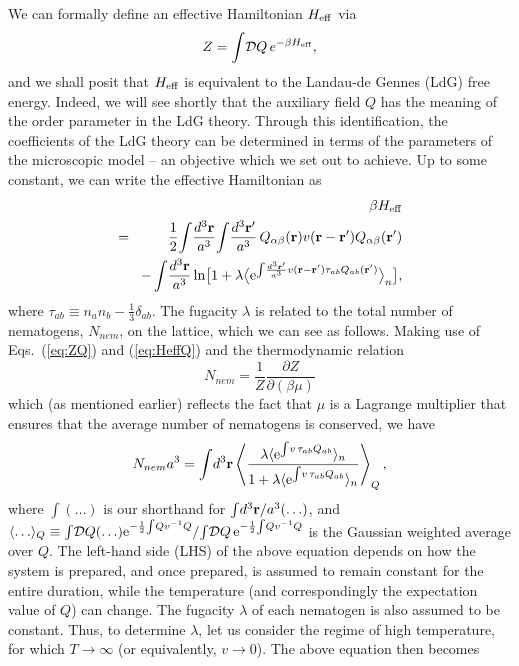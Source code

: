 \documentclass[jcp,aps,twocolumn,showpacs,supergroupedaddress,epsfig,amsmath,amssymb,eqsecnum]{revtex4}
\newcommand{\be}{\begin{equation}}
\newcommand{\ee}{\end{equation}}
\newcommand{\ba}{\begin{eqnarray}}
\newcommand{\ea}{\end{eqnarray}}
\newcommand{\rv}{{\bf r}}
\begin{document}
We can formally define an effective Hamiltonian $H_{{\rm eff}}$ via
\be
\label{eq:ZQ}
Z = \int \! \mathcal{D}Q \, e^{-\beta H_{{\rm eff}}},
\ee
and we shall posit that $H_{{\rm eff}}$ is equivalent to the Landau-de Gennes (LdG) free energy. Indeed, we will see shortly that the auxiliary field $Q$ has the meaning of the order parameter in the LdG theory. Through this identification, the coefficients of the LdG theory can be determined in terms of the parameters of the microscopic model -- an objective which we set out to achieve. 
Up to some constant, we can write the effective Hamiltonian as
\ba
\label{eq:HeffQ}
&&\beta H_{{\rm eff}} 
\\
&\!=\!& 
\frac{1}{2} 
\!\int \! \frac{d^3\rv}{a^3} \! \int \! \frac{d^3\rv'}{a^3} \, 
Q_{\alpha\beta}(\rv) v(\rv-\rv') Q_{\alpha\beta}(\rv') 
\nonumber\\
&&- \int \! \frac{d^3\rv}{a^3} \ln \! 
\big[ 
1 + \lambda \big\langle 
{\rm e}^{\int \! \frac{d^3\rv'}{a^3} v(\rv-\rv') \tau_{ab} Q_{ab}(\rv')}
\big\rangle_{n}
\big],
\nonumber
\ea
where $\tau_{ab} \equiv n_{a}n_{b}-\frac{1}{3}\delta_{ab}$. 
The fugacity $\lambda$ is related to the total number of nematogens, $N_{nem}$, on the lattice, which we can see as follows. Making use of Eqs.~(\ref{eq:ZQ}) and (\ref{eq:HeffQ}) and the thermodynamic relation 
\be
N_{nem} = \frac{1}{Z} \frac{\partial Z}{\partial (\beta \mu)} 
\ee
which (as mentioned earlier) reflects the fact that $\mu$ is a Lagrange multiplier that ensures that the average number of nematogens is conserved, we have 
\be
N_{nem} a^3 = \int\! d^3\rv \left\langle \frac{\lambda \langle {\rm e}^{\int \! v \,\tau_{ab} Q_{ab}} \rangle_n}{1 + \lambda \langle {\rm e}^{\int \! v \, \tau_{ab} Q_{ab}} \rangle_n} \right\rangle_Q,
\ee
where $\int (\ldots)$ is our shorthand for $\int\! d^3\rv/a^3 (\ldots)$, and $\langle \ldots \rangle_Q \equiv \int \! \mathcal{D}Q (\ldots) {\rm e}^{-\frac{1}{2} \! \int \! Q v^{-1} Q}/ \! \int \! \mathcal{D}Q \, {\rm e}^{-\frac{1}{2} \! \int \! Q v^{-1} Q}$ is the Gaussian weighted average over $Q$. The left-hand side (LHS) of the above equation depends on how the system is prepared, and once prepared, is assumed to remain constant for the entire duration, while the temperature (and correspondingly the expectation value of $Q$) can change. The fugacity $\lambda$ of each nematogen is also assumed to be constant. Thus, to determine $\lambda$, let us consider the regime of high temperature, for which $T \rightarrow \infty$ (or equivalently, $v \rightarrow 0$). The above equation then becomes
\end{document}
